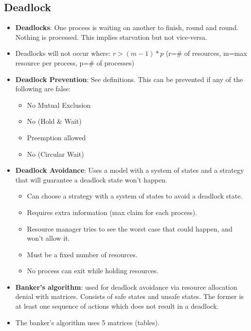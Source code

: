 \documentclass[fontsize=5pt]{scrartcl}
\begin{document}
\begin{multicols}{3}
       \subsection{Deadlock}
         \begin{itemize}
          \item \textbf{Deadlocks}: One process is waiting on another to finish, round and round. Nothing is processed. This implies starvation but not vice-versa.
          \item Deadlocks will not occur where: $r>(m-1)*p$ (r=\# of resources, m=max resource per process, p=\# of processes)
          \item \textbf{Deadlock Prevention}: See definitions. This can be prevented if any of the following are false:
          \begin{itemize}
            \item No Mutual Exclusion
            \item No (Hold \& Wait)
            \item Preemption allowed
            \item No (Circular Wait)
          \end{itemize}
           \item \textbf{Deadlock Avoidance}: Uses a model with a system of states and a strategy that will guarantee a deadlock state won't happen.
           \begin{itemize}
             \item Can choose a strategy with a system of states to avoid a deadlock state.
             \item Requires extra information (max claim for each process).
             \item Resource manager tries to see the worst case that could happen, and won't allow it.
             \item Must be a fixed number of resources.
             \item No process can exit while holding resources.
           \end{itemize}
           \item \textbf{Banker's algorithm}: used for deadlock avoidance via resource allocation denial with matrices. Consists of safe states and unsafe states.
                 The former is at least one sequence of actions which does not result in a deadlock.
           \item The banker's algorithm uses 5 matrices (tables).
           \begin{itemize}

\end{itemize}
\end{itemize}
\end{multicols}
\end{document}
